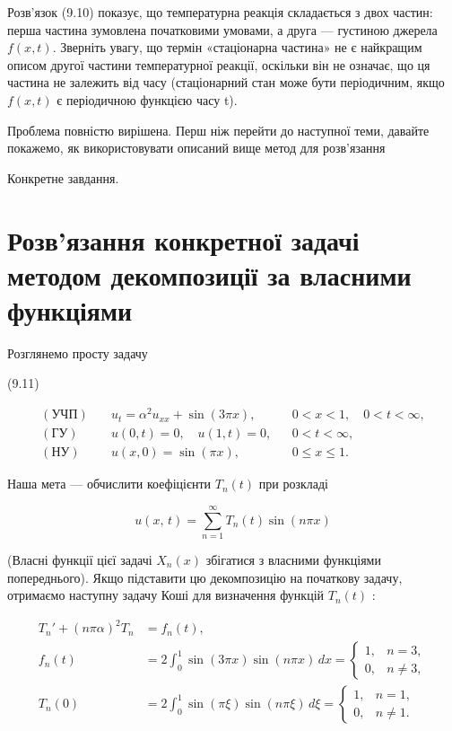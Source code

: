 \documentclass[
  ukrainian,
]{article}
\begin{document}
Розв'язок (9.10) показує, що температурна реакція складається з двох
частин: перша частина зумовлена початковими умовами, а друга ---
густиною джерела \(f(x,t)\). Зверніть увагу, що термін «стаціонарна
частина» не є найкращим описом другої частини температурної реакції,
оскільки він не означає, що ця частина не залежить від часу
(стаціонарний стан може бути періодичним, якщо \(f(x, t)\) є періодичною
функцією часу t).

Проблема повністю вирішена. Перш ніж перейти до наступної теми, давайте
покажемо, як використовувати описаний вище метод для розв'язання

Конкретне завдання.

\section{Розв'язання конкретної задачі методом декомпозиції за власними
функціями}\label{ux440ux43eux437ux432ux44fux437ux430ux43dux43dux44f-ux43aux43eux43dux43aux440ux435ux442ux43dux43eux457-ux437ux430ux434ux430ux447ux456-ux43cux435ux442ux43eux434ux43eux43c-ux434ux435ux43aux43eux43cux43fux43eux437ux438ux446ux456ux457-ux437ux430-ux432ux43bux430ux441ux43dux438ux43cux438-ux444ux443ux43dux43aux446ux456ux44fux43cux438}

Розглянемо просту задачу

(9.11)

\[
\begin{aligned}
(\text{УЧП})\quad & u_t = \alpha^2 u_{xx} + \sin(3\pi x), && 0 < x < 1,\quad 0 < t < \infty, \\
(\text{ГУ})\quad & u(0,t)=0,\quad u(1,t)=0, && 0 < t < \infty, \\
(\text{НУ})\quad & u(x,0)=\sin(\pi x), && 0 \le x \le 1.
\end{aligned}
\]

Наша мета --- обчислити коефіцієнти \(T_n(t)\) при розкладі

\[
u\left(x,\,t\right)=\sum_{n=1}^{\infty}T_n(t)\sin(n\pi x)
\]

(Власні функції цієї задачі \(X_n(x)\) збігатися з власними функціями
попереднього). Якщо підставити цю декомпозицію на початкову задачу,
отримаємо наступну задачу Коші для визначення функцій \(T_n(t)\) :

\[
\begin{aligned}
T_n' + (n\pi\alpha)^2 T_n &= f_n(t), \\
f_n(t) &= 2 \int_0^1 \sin(3\pi x)\sin(n\pi x)\,dx
= \begin{cases}
1, & n = 3, \\
0, & n \ne 3,
\end{cases} \\
T_n(0) &= 2 \int_0^1 \sin(\pi \xi)\sin(n\pi \xi)\,d\xi
= \begin{cases}
1, & n = 1, \\
0, & n \ne 1.
\end{cases}
\end{aligned}
\]
\end{document}

